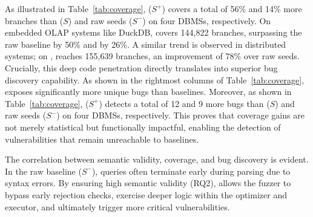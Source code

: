 \documentclass[sigconf,review,anonymous]{acmart}
\begin{document}
As illustrated in Table~\ref{tab:coverage}, \tool{} ($S^+$) covers a total of 56\% and 14\% more branches than \sedar{} ($S$) and raw seeds ($S^-$) on four DBMSs, respectively. 
On embedded OLAP systems like DuckDB, \tool{} covers 144,822 branches, surpassing the raw baseline by 50\% and \sedar{} by 26\%. 
A similar trend is observed in distributed systems; on \clickhouse{}, \tool{} reaches 155,639 branches, an improvement of 78\% over raw seeds. 
Crucially, this deep code penetration directly translates into superior bug discovery capability. As shown in the rightmost columns of Table~\ref{tab:coverage}, \tool{} exposes significantly more unique bugs than baselines. 
Moreover, as shown in Table~\ref{tab:coverage}, \tool{} ($S^+$) detects a total of 12 and 9 more bugs than \sedar{} ($S$) and raw seeds ($S^{-}$) on four DBMSs, respectively. 
This proves that coverage gains are not merely statistical but functionally impactful, enabling the detection of vulnerabilities that remain unreachable to baselines.

The correlation between semantic validity, coverage, and bug discovery is evident. In the raw baseline ($S^-$), queries often terminate early during parsing due to syntax errors. By ensuring high semantic validity (RQ2), \tool{} allows the fuzzer to bypass early rejection checks, exercise deeper logic within the optimizer and executor, and ultimately trigger more critical vulnerabilities.
\end{document}
